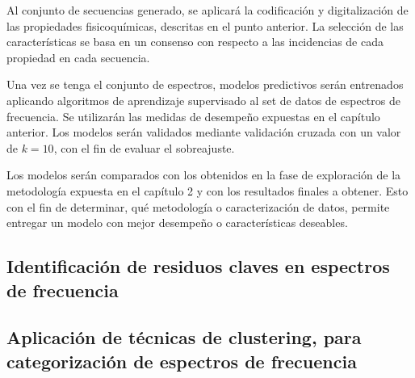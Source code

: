 Al conjunto de secuencias generado, se aplicará la codificación y digitalización de las propiedades fisicoquímicas, descritas en el punto anterior. La selección de las características se basa en un consenso con respecto a las incidencias de cada propiedad en cada secuencia.

Una vez se tenga el conjunto de espectros, modelos predictivos serán entrenados aplicando algoritmos de aprendizaje supervisado al set de datos de espectros de frecuencia. Se utilizarán las medidas de desempeño expuestas en el capítulo anterior. Los modelos serán validados mediante validación cruzada con un valor de $k=10$, con el fin de evaluar el sobreajuste. 

Los modelos serán comparados con los obtenidos en la fase de exploración de la metodología expuesta en el capítulo 2 y con los resultados finales a obtener. Esto con el fin de determinar, qué metodología o caracterización de datos, permite entregar un modelo con mejor desempeño o características deseables.

\subsection{Identificación de residuos claves en espectros de frecuencia}


\subsection{Aplicación de técnicas de clustering, para categorización de espectros de frecuencia}


 